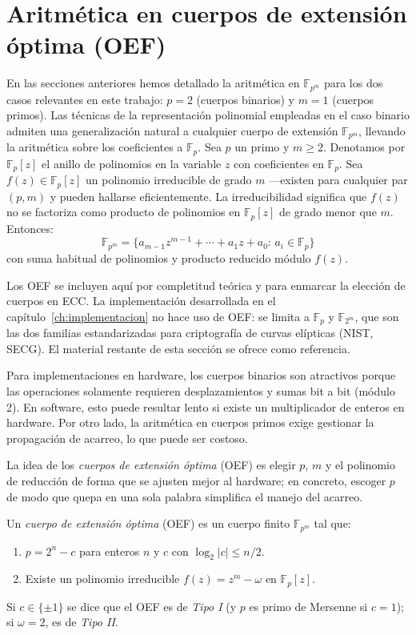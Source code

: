 \section{Aritmética en cuerpos de extensión óptima (OEF)}
\label{sec:aritmetica-oef}
En las secciones anteriores hemos detallado la aritmética en \(\mathbb{F}_{p^m}\) para los dos casos relevantes en este trabajo: \(p=2\) (cuerpos binarios) y \(m=1\) (cuerpos primos). Las técnicas de la representación polinomial empleadas en el caso binario admiten una generalización natural a cualquier cuerpo de extensión \(\mathbb{F}_{p^m}\), llevando la aritmética sobre los coeficientes a \(\mathbb{F}_p\). Sea $p$ un primo y $m\ge2$. Denotamos por $\mathbb{F}_p[z]$ el anillo de polinomios en la variable $z$ con coeficientes en $\mathbb{F}_p$. Sea $f(z)\in\mathbb{F}_p[z]$ un polinomio irreducible de grado $m$ ---existen para cualquier par $(p,m)$ y pueden hallarse eficientemente. La irreducibilidad significa que $f(z)$ no se factoriza como producto de polinomios en $\mathbb{F}_p[z]$ de grado menor que $m$. Entonces:
\[
  \mathbb{F}_{p^m}=\{a_{m-1}z^{m-1}+\cdots+a_1z+a_0:\,a_i\in\mathbb{F}_p\}
\]
con suma habitual de polinomios y producto reducido módulo $f(z)$.

\begin{remark}
Los OEF se incluyen aquí por completitud teórica y para enmarcar la elección de cuerpos en ECC. La implementación desarrollada en el capítulo~\ref{ch:implementacion} no hace uso de OEF: se limita a $\mathbb{F}_p$ y $\mathbb{F}_{2^m}$, que son las dos familias estandarizadas para criptografía de curvas elípticas (NIST, SECG). El material restante de esta sección se ofrece como referencia.
\end{remark}

Para implementaciones en hardware, los cuerpos binarios son atractivos porque las operaciones solamente requieren desplazamientos y sumas bit a bit (módulo 2). En software, esto puede resultar lento si existe un multiplicador de enteros en hardware. Por otro lado, la aritmética en cuerpos primos exige gestionar la propagación de acarreo, lo que puede ser costoso.

La idea de los \emph{cuerpos de extensión óptima} (OEF) es elegir \(p\), \(m\) y el polinomio de reducción de forma que se ajusten mejor al hardware; en concreto, escoger \(p\) de modo que quepa en una sola palabra simplifica el manejo del acarreo.

\begin{definicion}
Un \emph{cuerpo de extensión óptima} (OEF) es un cuerpo finito \(\mathbb{F}_{p^m}\) tal que:
\begin{enumerate}
  \item \(p = 2^n - c\) para enteros \(n\) y \(c\) con \(\log_2|c|\le n/2\).
  \item Existe un polinomio irreducible \(f(z)=z^m - \omega\) en \(\mathbb{F}_p[z]\).
\end{enumerate}
Si \(c\in\{\pm1\}\) se dice que el OEF es de \emph{Tipo I} (y \(p\) es primo de Mersenne si \(c=1\)); si \(\omega=2\), es de \emph{Tipo II}.
\end{definicion}

